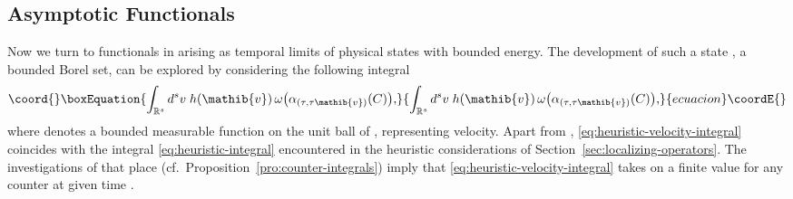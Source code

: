 \documentclass[a4paper,a4paper]{article}
\numberwithin{equation}{section}
\providecommand{\Cfrak}{\mathfrak{C}}
\providecommand{\vib}{\mathib{v}}
\providecommand{\Sscr}{\mathscr{S}}
\providecommand{\Rs}{\mathbb{R}^s}
\providecommand{\Cstar}{\mathfrak{C}^*}
\theoremstyle{definition}
\theoremstyle{plain}
\theoremstyle{remark}
\begin{document}

\subsection{Asymptotic Functionals}
  \label{subsec:asymptotic_functionals}
  
  Now we turn to functionals in \myHighlight{$\Cstar$}\coordHE{} arising as temporal limits of
  physical states with bounded energy. The development of such a state
  \myHighlight{$\omega \in \Sscr ( \Delta )$}\coordHE{}, \myHighlight{$\Delta$}\coordHE{} a bounded Borel set, can be
  explored by considering the following integral
  \begin{equation}\coord{}\boxEquation{
    \label{eq:heuristic-velocity-integral}
    \int_{\Rs} d^s v \; h ( \vib ) \, \omega \bigl( \alpha_{( \tau ,
      \tau \vib )} ( C ) \bigr) \text{,}
  }{
    \int_{\Rs} d^s v \; h ( \vib ) \, \omega \bigl( \alpha_{( \tau ,
      \tau \vib )} ( C ) \bigr) \text{,}
  }{ecuacion}\coordE{}\end{equation}
  where \coordHE{} denotes a bounded measurable function on the unit ball of
  \myHighlight{$\Rs$}\coordHE{}, \myHighlight{$\vib$}\coordHE{} representing velocity. Apart from \coordHE{},
  \eqref{eq:heuristic-velocity-integral} coincides with the integral
  \eqref{eq:heuristic-integral} encountered in the heuristic
  considerations of Section~\ref{sec:localizing-operators}. The
  investigations of that place
  (cf.~Proposition~\ref{pro:counter-integrals}) imply that
  \eqref{eq:heuristic-velocity-integral} takes on a finite value for
  any counter \myHighlight{$C \in \Cfrak$}\coordHE{} at given time \myHighlight{$\tau$}\coordHE{}.
  
\end{document}
